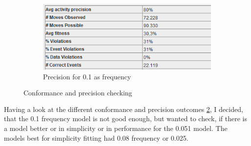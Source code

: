 \begin{figure}[!htbp]
\begin{subfigure}{.4\textwidth}
  \centering
  \includegraphics[width=\linewidth]{P_Precision0-1.PNG}
  \caption{Precision for 0.1 as frequency}
  \label{fig:P_Prec0-1}
\end{subfigure}
\caption{Conformance and precision checking}
\label{fig:P_ConfPrec}
\end{figure}


Having a look at the different conformance and precision outcomes \ref{fig:P_ConfPrec}, I decided, that the 0.1 frequency model is not good enough, but wanted to check, if there is a model better or in simplicity or in performance for the 0.051 model. The models best for simplicity fitting had 0.08 frequency or 0.025.

